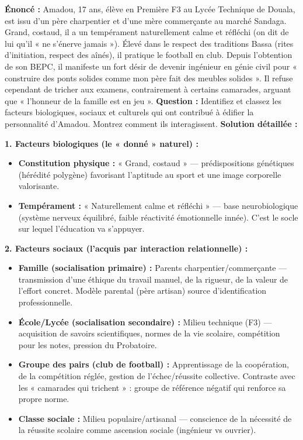 \documentclass[11pt]{article}
\newcommand{\cle}[1]{{\popxbold\color{popdark}#1}}
\begin{document}
\begin{exoresolu}
\textbf{Énoncé :} Amadou, 17 ans, élève en Première F3 au Lycée Technique de Douala, est issu d'un père charpentier et d'une mère commerçante au marché Sandaga. Grand, costaud, il a un tempérament naturellement calme et réfléchi (on dit de lui qu'il « ne s'énerve jamais »). Élevé dans le respect des traditions Bassa (rites d'initiation, respect des aînés), il pratique le football en club. Depuis l'obtention de son BEPC, il manifeste un fort désir de devenir ingénieur en génie civil pour « construire des ponts solides comme mon père fait des meubles solides ». Il refuse cependant de tricher aux examens, contrairement à certains camarades, arguant que « l'honneur de la famille est en jeu ».
\textbf{Question :} Identifiez et classez les facteurs biologiques, sociaux et culturels qui ont contribué à édifier la personnalité d'Amadou. Montrez comment ils interagissent.
\tcblower
\textbf{Solution détaillée :}

\textbf{1. Facteurs biologiques (le « donné » naturel) :}
\begin{itemize}
    \item \textbf{Constitution physique :} « Grand, costaud » — prédispositions génétiques (hérédité polygène) favorisant l'aptitude au sport et une image corporelle valorisante.
    \item \textbf{Tempérament :} « Naturellement calme et réfléchi » — base neurobiologique (système nerveux équilibré, faible réactivité émotionnelle innée). C'est le \cle{socle} sur lequel l'éducation va s'appuyer.
\end{itemize}

\textbf{2. Facteurs sociaux (l'acquis par interaction relationnelle) :}
\begin{itemize}
    \item \textbf{Famille (socialisation primaire) :} Parents charpentier/commerçante — transmission d'une \cle{éthique du travail} manuel, de la rigueur, de la valeur de l'effort concret. Modèle parental (père artisan) source d'identification professionnelle.
    \item \textbf{École/Lycée (socialisation secondaire) :} Milieu technique (F3) — acquisition de savoirs scientifiques, normes de la vie scolaire, compétition pour les notes, pression du Probatoire.
    \item \textbf{Groupe des pairs (club de football) :} Apprentissage de la coopération, de la compétition réglée, gestion de l'échec/réussite collective. Contraste avec les « camarades qui trichent » : groupe de référence négatif qui renforce sa propre norme.
    \item \textbf{Classe sociale :} Milieu populaire/artisanal — conscience de la nécessité de la réussite scolaire comme ascension sociale (ingénieur vs ouvrier).
\end{itemize}


\end{exoresolu}
\end{document}
